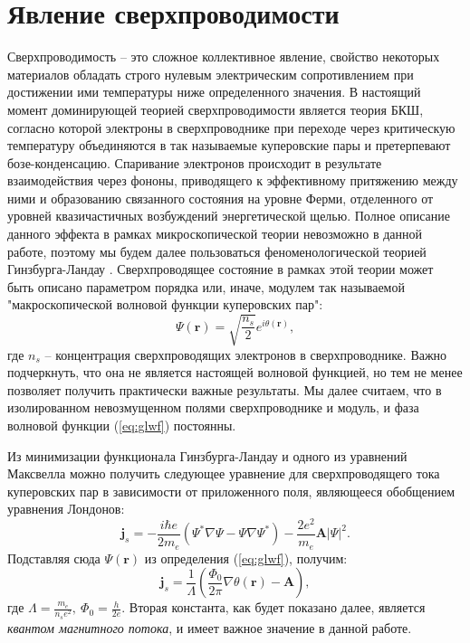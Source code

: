 \documentclass[12pt]{article}
\numberwithin{equation}{section}
\begin{document}
\section{Явление сверхпроводимости}
Сверхпроводимость -- это сложное коллективное явление, свойство некоторых материалов обладать строго нулевым электрическим сопротивлением при достижении ими температуры ниже определенного значения. В настоящий момент доминирующей теорией сверхпроводимости является теория БКШ\cite{Schrieffer1999}, согласно которой электроны в сверхпроводнике при переходе через критическую температуру объединяются в так называемые куперовские пары и претерпевают бозе-конденсацию. Спаривание электронов происходит в результате взаимодействия через фононы, приводящего к эффективному притяжению между ними и образованию связанного состояния на уровне Ферми, отделенного от уровней квазичастичных возбуждений энергетической щелью. Полное описание данного эффекта в рамках микроскопической теории невозможно в данной работе, поэтому мы будем далее пользоваться феноменологической теорией Гинзбурга-Ландау \cite{GL1950}. Сверхпроводящее состояние в рамках этой теории может быть описано параметром порядка или, иначе, модулем так называемой "макроскопической волновой функции куперовских пар":
\begin{equation}
\Psi(\mathbf{r}) = \sqrt{\frac{n_s}{2}}e^{i\theta(\mathbf{r})},
\label{eq:glwf} 
\end{equation}
где $n_s$ -- концентрация сверхпроводящих электронов в сверхпроводнике. Важно подчеркнуть, что она не является настоящей волновой функцией\cite{Gorkov1959}, но тем не менее позволяет получить практически важные результаты. Мы далее считаем, что в изолированном невозмущенном полями сверхпроводнике и модуль, и фаза волновой функции (\ref{eq:glwf}) постоянны.

Из минимизации функционала Гинзбурга-Ландау и одного из уравнений Максвелла можно получить следующее уравнение для сверхпроводящего тока куперовских пар в зависимости от приложенного поля, являющееся обобщением уравнения Лондонов:
\begin{equation}
\mathbf{j}_s = -\frac{i\hbar e}{2m_e}(\Psi^*\nabla\Psi - \Psi\nabla\Psi^*) - \frac{2e^2}{m_e}\mathbf{A}|\Psi|^2.
\label{eq:lond}
\end{equation}
Подставляя сюда $\Psi(\mathbf{r})$ из определения (\ref{eq:glwf}), получим:
\begin{equation}
\mathbf{j}_s = \frac{1}{\Lambda}\left(\frac{\Phi_0}{2\pi}\nabla\theta(\mathbf{r})-\mathbf{A}\right),
\label{eq:lond2}
\end{equation}
где $\displaystyle \Lambda = \frac{m_e}{n_s e^2},\ \Phi_0 = \frac{h}{2e}$. Вторая константа, как будет показано далее, является \textit{квантом магнитного потока}, и имеет важное значение в данной работе.
\end{document}
